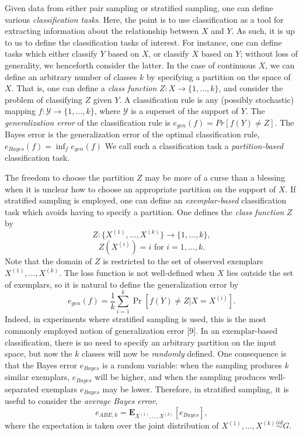 \documentclass{article}
\newcommand{\E}{\textbf{E}}
\begin{document}
Given data from either pair sampling or stratified sampling, one can
define various \emph{classification tasks}.  Here, the point is to use
classification as a tool for extracting information about the
relationship between $X$ and $Y$.  As such, it is up to us to define
the classification tasks of interest.  For instance, one can define
tasks which either classify $Y$ based on $X$, or classify $X$ based on
$Y$; without loss of generality, we henceforth consider the latter.
In the case of continuous $X$, we can define an arbitrary number of
classes $k$ by specifying a partition on the space of $X$.  That is,
one can define a \emph{class function} $Z: X \to \{1,\hdots, k\}$, and
consider the problem of classifying $Z$ given $Y$.  A classification
rule is any (possibly stochastic) mapping $f: \mathcal{Y} \to
\{1,\hdots, k\}$, where $\mathcal{Y}$ is a superset of the support of
$Y$.  The \emph{generalization error} of the classification rule is $
e_{gen}(f) = Pr[f(Y) \neq Z].  $ The Bayes error is the generalization
error of the optimal classification rule, $ e_{Bayes}(f) = \inf_f
e_{gen}(f) $ We call such a classification task a
\emph{partition-based} classification task.

The freedom to choose the partition $Z$ may be more of a curse than a
blessing when it is unclear how to choose an appropriate partition on
the support of $X$.  If stratified sampling is employed, one can
define an \emph{exemplar-based} classification task which avoids
having to specify a partition.  One defines the \emph{class function}
$Z$ by
\[
Z: \{X^{(1)}, \hdots, X^{(k)}\} \to \{1,\hdots, k\},
\]
\[
Z(X^{(i)}) = i\text{ for }i = 1, \hdots, k.
\]
Note that the domain of $Z$ is restricted to the set of observed
exemplars $X^{(1)},\hdots, X^{(k)}$.  The loss function is not
well-defined when $X$ lies outside the set of exemplars, so it is
natural to define the generalization error by
\begin{equation}\label{egendef}
e_{gen}(f) = \frac{1}{k} \sum_{i=1}^k\Pr[f(Y) \neq Z|X = X^{(i)}].
\end{equation}
Indeed, in experiments where stratified sampling is used, this is the
most commonly employed notion of generalization error [9].  
In an exemplar-based classification, there is no need to
specify an arbitrary partition on the input space, but now the $k$
classes will now be \emph{randomly} defined.  One consequence is that
the Bayes error $e_{Bayes}$ is a random variable: when the sampling
produces $k$ similar exemplars, $e_{Bayes}$ will be higher, and when
the sampling produces well-separated exemplars $e_{Bayes}$ may be
lower.  Therefore, in stratified sampling, it is useful to consider
the \emph{average Bayes error},
\begin{equation}\label{abedef}
e_{ABE, k} = \E_{X^{(1)},\hdots, X^{(k)}}[e_{Bayes}],
\end{equation}
where the expectation is taken over the joint distribution of
$X^{(1)},\hdots, X^{(k)} \stackrel{iid}{\sim} G$.
\end{document}
